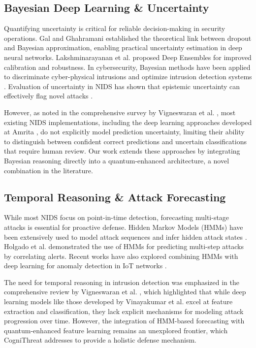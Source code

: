 \documentclass[conference]{IEEEtran}
\begin{document}
\subsection{Bayesian Deep Learning \& Uncertainty}
Quantifying uncertainty is critical for reliable decision-making in security operations. Gal and Ghahramani \cite{ref9} established the theoretical link between dropout and Bayesian approximation, enabling practical uncertainty estimation in deep neural networks. Lakshminarayanan et al. \cite{ref10} proposed Deep Ensembles for improved calibration and robustness. In cybersecurity, Bayesian methods have been applied to discriminate cyber-physical intrusions \cite{ref17} and optimize intrusion detection systems \cite{ref18}. Evaluation of uncertainty in NIDS has shown that epistemic uncertainty can effectively flag novel attacks \cite{ref19}. 

However, as noted in the comprehensive survey by Vigneswaran et al. \cite{vigneswaran2020compendium}, most existing NIDS implementations, including the deep learning approaches developed at Amrita \cite{vinayakumar2017rnn, vinayakumar2017applying}, do not explicitly model prediction uncertainty, limiting their ability to distinguish between confident correct predictions and uncertain classifications that require human review. Our work extends these approaches by integrating Bayesian reasoning directly into a quantum-enhanced architecture, a novel combination in the literature.

\subsection{Temporal Reasoning \& Attack Forecasting}
While most NIDS focus on point-in-time detection, forecasting multi-stage attacks is essential for proactive defense. Hidden Markov Models (HMMs) have been extensively used to model attack sequences and infer hidden attack states \cite{ref20, ref21}. Holgado et al. \cite{ref22} demonstrated the use of HMMs for predicting multi-step attacks by correlating alerts. Recent works have also explored combining HMMs with deep learning for anomaly detection in IoT networks \cite{ref23}. 

The need for temporal reasoning in intrusion detection was emphasized in the comprehensive review by Vigneswaran et al. \cite{vigneswaran2020compendium}, which highlighted that while deep learning models like those developed by Vinayakumar et al. \cite{vinayakumar2017applying, vinayakumar2017rnn} excel at feature extraction and classification, they lack explicit mechanisms for modeling attack progression over time. However, the integration of HMM-based forecasting with quantum-enhanced feature learning remains an unexplored frontier, which CogniThreat addresses to provide a holistic defense mechanism.
\end{document}
